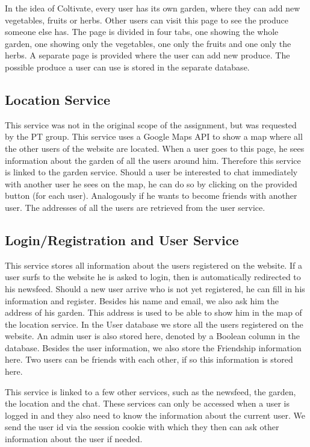\documentclass[a4paper,12pt]{article}
\begin{document}
In the idea of Coltivate, every user has its own garden, where they can add new vegetables, fruits or herbs. Other users can visit this page to see the produce someone else has. The page is divided in four tabs, one showing the whole garden, one showing only the vegetables, one only the fruits and one only the herbs. A separate page is provided where the user can add new produce. The possible produce a user can use is stored in the separate database.

\subsection{Location Service}

This service was not in the original scope of the assignment, but was requested by the PT group. This service uses a Google Maps API to show a map where all the other users of the website are located. When a user goes to this page, he sees information about the garden of all the users around him. Therefore this service is linked to the garden service. Should a user be interested to chat immediately with another user he sees on the map, he can do so by clicking on the provided button (for each user). Analogously if he wants to become friends with another user. The addresses of all the users are retrieved from the user service.

\subsection{Login/Registration and User Service}

This service stores all information about the users registered on the website. If a user surfs to the website he is asked to login, then is automatically redirected to his newsfeed. Should a new user arrive who is not yet registered, he can fill in his information and register. Besides his name and email, we also ask him the address of his garden. This address is used to be able to show him in the map of the location service. In the User database we store all the users registered on the website. An admin user is also stored here, denoted by a Boolean column in the database. Besides the user information, we also store the Friendship information here. Two users can be friends with each other, if so this information is stored here.
\newline

This service is linked to a few other services, such as the newsfeed, the garden, the location and the chat. These services can only be accessed when a user is logged in and they also need to know the information about the current user. We send the user id via the session cookie with which they then can ask other information about the user if needed. 
\end{document}
